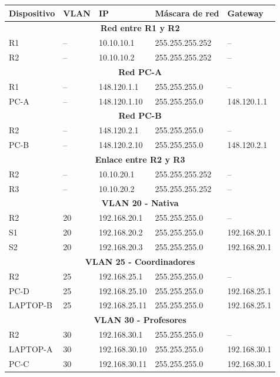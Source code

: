 \documentclass[12pt]{article}
\begin{document}
\begin{center}
\renewcommand{\arraystretch}{1.2}
\begin{tabular}{|l|l|l|l|l|}
\hline
\textbf{Dispositivo} & \textbf{VLAN} & \textbf{IP} &
\textbf{Máscara de red} & \textbf{Gateway} \\
\hline

\multicolumn{5}{|c|}{\textbf{Red entre R1 y R2}} \\
\hline
R1 & -- & 10.10.10.1 & 255.255.255.252 & -- \\
R2 & -- & 10.10.10.2 & 255.255.255.252 & -- \\
\hline

\multicolumn{5}{|c|}{\textbf{Red PC-A}} \\
\hline
R1 & -- & 148.120.1.1 & 255.255.255.0 & -- \\
PC-A & -- & 148.120.1.10 & 255.255.255.0 & 148.120.1.1 \\
\hline

\multicolumn{5}{|c|}{\textbf{Red PC-B}} \\
\hline
R2 & -- & 148.120.2.1 & 255.255.255.0 & -- \\
PC-B & -- & 148.120.2.10 & 255.255.255.0 & 148.120.2.1 \\
\hline

\multicolumn{5}{|c|}{\textbf{Enlace entre R2 y R3}} \\
\hline
R2 & -- & 10.10.20.1 & 255.255.255.252 & -- \\
R3 & -- & 10.10.20.2 & 255.255.255.252 & -- \\
\hline

\multicolumn{5}{|c|}{\textbf{VLAN 20 - Nativa}} \\
\hline
R2 & 20 & 192.168.20.1 & 255.255.255.0 & -- \\
S1 & 20 & 192.168.20.2 & 255.255.255.0 & 192.168.20.1 \\
S2 & 20 & 192.168.20.3 & 255.255.255.0 & 192.168.20.1 \\
\hline

\multicolumn{5}{|c|}{\textbf{VLAN 25 - Coordinadores}} \\
\hline
R2 & 25 & 192.168.25.1 & 255.255.255.0 & -- \\
PC-D & 25 & 192.168.25.10 & 255.255.255.0 & 192.168.25.1 \\
LAPTOP-B & 25 & 192.168.25.11 & 255.255.255.0 & 192.168.25.1 \\
\hline

\multicolumn{5}{|c|}{\textbf{VLAN 30 - Profesores}} \\
\hline
R2 & 30 & 192.168.30.1 & 255.255.255.0 & -- \\
LAPTOP-A & 30 & 192.168.30.10 & 255.255.255.0 & 192.168.30.1 \\
PC-C & 30 & 192.168.30.11 & 255.255.255.0 & 192.168.30.1 \\
\hline


\end{tabular}
\end{center}
\end{document}
